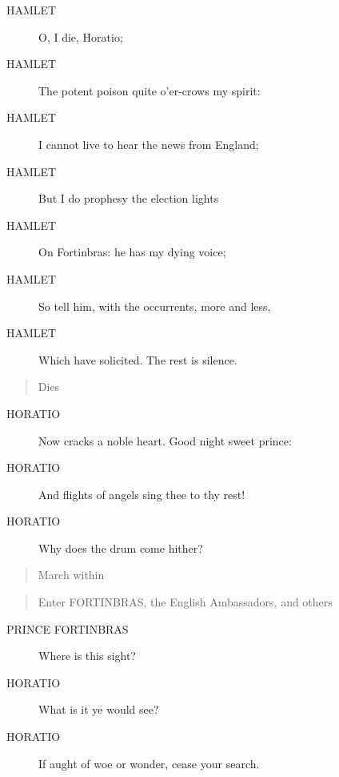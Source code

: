 \documentclass{article}
\begin{document}
\begin{description}
            
\item[HAMLET] O, I die, Horatio;
\item[HAMLET] The potent poison quite o'er-crows my spirit:
\item[HAMLET] I cannot live to hear the news from England;
\item[HAMLET] But I do prophesy the election lights
\item[HAMLET] On Fortinbras: he has my dying voice;
\item[HAMLET] So tell him, with the occurrents, more and less,
\item[HAMLET] Which have solicited. The rest is silence.
\end{description}
          
\begin{quote}
Dies
\end{quote}
          
\begin{description}
            
\item[HORATIO] Now cracks a noble heart. Good night sweet prince:
\item[HORATIO] And flights of angels sing thee to thy rest!
\item[HORATIO] Why does the drum come hither?
\end{description}
          
\begin{quote}
March within
\end{quote}
          
\begin{quote}
Enter FORTINBRAS, the English Ambassadors,
and others
\end{quote}
          
\begin{description}
            
\item[PRINCE FORTINBRAS] Where is this sight?
\end{description}
          
\begin{description}
            
\item[HORATIO] What is it ye would see?
\item[HORATIO] If aught of woe or wonder, cease your search.
\end{description}
          
\end{document}
